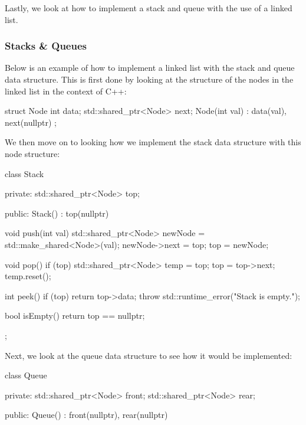 Lastly, we look at how to implement a stack and queue with the use of a linked list.

\begin{highlight}

\subsubsection*{Stacks \& Queues}

Below is an example of how to implement a linked list with the stack and queue data structure. This is first done by looking at the structure of the nodes in the linked list in the context of
C++:

\begin{code}
struct Node {
    int data;
    std::shared_ptr<Node> next;
    Node(int val) : data(val), next(nullptr) {}
};
\end{code}

We then move on to looking how we implement the stack data structure with this node structure:

\begin{code}
class Stack {
    private:
        std::shared_ptr<Node> top;
    
    public:
        Stack() : top(nullptr) {}
    
        void push(int val) {
            std::shared_ptr<Node> newNode = std::make_shared<Node>(val);
            newNode->next = top;
            top = newNode;
        }
    
        void pop() {
            if (top) {
                std::shared_ptr<Node> temp = top;
                top = top->next;
                temp.reset();
            }
        }
    
        int peek() {
            if (top) {
                return top->data;
            }
            throw std::runtime_error("Stack is empty.");
        }
    
        bool isEmpty() {
            return top == nullptr;
        }
    };        
\end{code}

Next, we look at the queue data structure to see how it would be implemented: 

\begin{code}
class Queue {
    private:
        std::shared_ptr<Node> front;
        std::shared_ptr<Node> rear;
    
    public:
        Queue() : front(nullptr), rear(nullptr) {}
    
}
\end{code}
\end{highlight}
